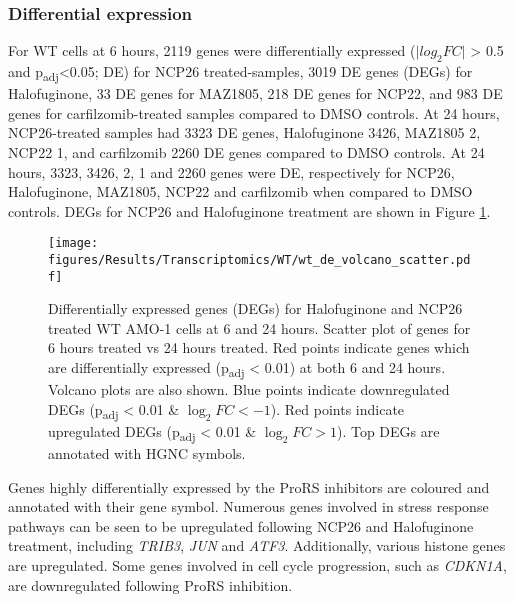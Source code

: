 \subsubsection{Differential expression}
For WT cells at 6 hours, 2119 genes were differentially expressed ($\lvert log_{2}FC \rvert$ > 0.5 and p\textsubscript{adj}<0.05; DE) for NCP26 treated-samples, 3019 DE genes (DEGs) for Halofuginone, 33 DE genes for MAZ1805, 218 DE genes for NCP22, and 983 DE genes for carfilzomib-treated samples compared to DMSO controls.
At 24 hours, NCP26-treated samples had 3323 DE genes, Halofuginone 3426, MAZ1805 2, NCP22 1, and carfilzomib 2260 DE genes compared to DMSO controls.
At 24 hours, 3323, 3426, 2, 1 and 2260 genes were DE, respectively for NCP26, Halofuginone, MAZ1805, NCP22 and carfilzomib when compared to DMSO controls.
DEGs for NCP26 and Halofuginone treatment are shown in Figure \ref{fig:wt_de}.
%
\begin{figure}[htb]
\centering
\texttt{[image: figures/Results/Transcriptomics/WT/wt\_de\_volcano\_scatter.pdf]}
\caption[Differentially expressed genes WT AMO-1 cells]{Differentially expressed genes (DEGs) for Halofuginone and NCP26 treated WT AMO-1 cells at 6 and 24 hours.
Scatter plot of genes for 6 hours treated vs 24 hours treated.
Red points indicate genes which are differentially expressed (p\textsubscript{adj} < 0.01) at both 6 and 24 hours.
Volcano plots are also shown.
Blue points indicate downregulated DEGs (p\textsubscript{adj} < 0.01 \& $\log_{2}FC < -1$).
Red points indicate upregulated DEGs (p\textsubscript{adj} < 0.01 \& $\log_{2}FC > 1$).
Top DEGs are annotated with HGNC symbols.
}
\label{fig:wt_de}
\end{figure}
Genes highly differentially expressed by the ProRS inhibitors are coloured and annotated with their gene symbol.
Numerous genes involved in stress response pathways can be seen to be upregulated following NCP26 and Halofuginone treatment, including \textit{TRIB3}, \textit{JUN} and \textit{ATF3}.
Additionally, various histone genes are upregulated.
Some genes involved in cell cycle progression, such as \textit{CDKN1A}, are downregulated following ProRS inhibition.


